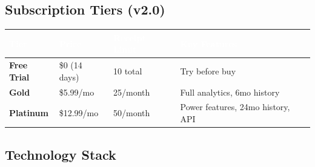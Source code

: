 \documentclass[11pt,a4paper]{article}
\begin{document}
\subsection{Subscription Tiers (v2.0)}

\begin{center}
\begin{tabular}{L{3cm} R{2cm} C{3cm} L{4.5cm}}
    \toprule
    \textcolor{white}{\textbf{Tier}} & \textcolor{white}{\textbf{Price}} & \textcolor{white}{\textbf{Receipt Limit}} & \textcolor{white}{\textbf{Key Features}}\\
    \midrule
     \textbf{Free Trial} & \$0 (14 days) & 10 total & Try before buy\\
     \textbf{Gold} & \$5.99/mo & 25/month & Full analytics, 6mo history\\
     \textbf{Platinum} & \$12.99/mo & 50/month & Power features, 24mo history, API\\
    \bottomrule
\end{tabular}
\end{center}

\subsection{Technology Stack}
\end{document}
